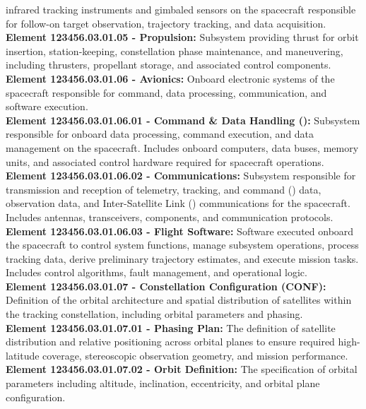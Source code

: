 infrared tracking instruments and gimbaled sensors on the  spacecraft responsible for
follow-on target observation, trajectory tracking, and data acquisition.\\
\textbf{Element 123456.03.01.05 - Propulsion:} Subsystem providing thrust for
 orbit insertion, station-keeping, constellation phase maintenance, and maneuvering,
including thrusters, propellant storage, and associated control components.\\
\textbf{Element 123456.03.01.06 - Avionics:} Onboard electronic systems of the 
spacecraft responsible for command, data processing, communication, and software execution.\\
\textbf{Element 123456.03.01.06.01 - Command \& Data Handling ():} Subsystem
responsible for onboard data processing, command execution, and data
management on the  spacecraft. Includes onboard computers, data buses, memory
units, and associated control hardware required for spacecraft operations.\\
\textbf{Element 123456.03.01.06.02 - Communications:} Subsystem responsible for
transmission and reception of telemetry, tracking, and command () data,
observation data, and Inter-Satellite Link () communications for the 
spacecraft. Includes antennas, transceivers,  components, and communication protocols.\\
\textbf{Element 123456.03.01.06.03 - Flight Software:} Software executed onboard the
 spacecraft to control system functions, manage subsystem operations, process tracking
data, derive preliminary trajectory estimates, and execute mission tasks. Includes control
algorithms, fault management, and operational logic.\\
\textbf{Element 123456.03.01.07 - Constellation Configuration (CONF):} Definition of the orbital
architecture and spatial distribution of satellites within the  tracking constellation,
including orbital parameters and phasing.\\
\textbf{Element 123456.03.01.07.01 - Phasing Plan:} The definition of  satellite
distribution and relative positioning across orbital planes to ensure required high-latitude
coverage, stereoscopic observation geometry, and mission performance.\\
\textbf{Element 123456.03.01.07.02 - Orbit Definition:} The specification of  orbital
parameters including altitude, inclination, eccentricity, and orbital plane configuration.\\
